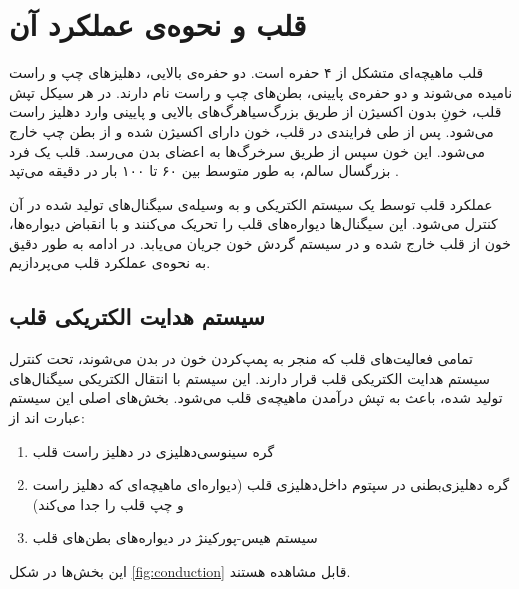 \label{chap:lit}
\pagebreak

\section {قلب و نحوه‌ی عملکرد آن}
قلب ماهیچه‌ای متشکل از ۴ حفره است. دو حفره‌ی بالایی، دهلیزهای چپ و راست نامیده می‌شوند و دو حفره‌ی پایینی، بطن‌های چپ و راست نام دارند. در هر سیکل تپش قلب، خونِ بدون اکسیژن از طریق بزرگ‌سیاهرگ‌های بالایی و پایینی وارد دهلیز راست می‌شود. پس از طی فرایندی در قلب، خون دارای اکسیژن شده و از بطن چپ خارج می‌شود. این خون سپس از طریق سرخرگ‌ها به اعضای بدن می‌رسد. قلب یک فرد بزرگسال سالم، به طور متوسط بین ۶۰ تا ۱۰۰ بار در دقیقه می‌تپد \cite{MayoClinic}.

عملکرد قلب توسط یک سیستم الکتریکی و به وسیله‌ی سیگنال‌های تولید شده در آن کنترل می‌شود. این سیگنال‌ها دیواره‌های قلب را تحریک می‌کنند و با انقباض دیواره‌ها، خون از قلب خارج شده و در سیستم گردش خون جریان می‌یابد. در ادامه به طور دقیق به نحوه‌ی عملکرد قلب می‌پردازیم. 


\subsection {سیستم هدایت الکتریکی قلب}
تمامی فعالیت‌های قلب که منجر به پمپ‌کردن خون در بدن می‌شوند، تحت کنترل سیستم هدایت الکتریکی قلب قرار دارند. این سیستم با انتقال الکتریکی سیگنال‌های تولید شده، باعث به تپش درآمدن ماهیچه‌ی قلب می‌شود. بخش‌های اصلی این سیستم عبارت اند از:

\begin{enumerate}
	\item گره سینوسی‌دهلیزی  در دهلیز 
	راست قلب
	\item گره دهلیزی‌بطنی  در سپتوم داخل‌دهلیزی قلب (دیواره‌ای ماهیچه‌ای که دهلیز راست و چپ قلب را جدا می‌کند)
	\item سیستم هیس-پورکینژ در دیواره‌های بطن‌های قلب
\end{enumerate}
این بخش‌ها در شکل \ref{fig:conduction} قابل مشاهده هستند.

